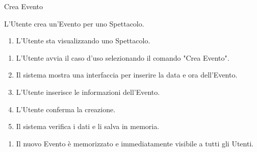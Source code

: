 {\ucExtTable	%
{	%
	Crea Evento
	
}{	%
	
}{	%
	L'Utente crea un'Evento per uno Spettacolo.
	
}{	%
	\attori
	
}{	%
	\begin{enumerate}
        \item L'Utente sta visualizzando uno Spettacolo.
    \end{enumerate}
	
}{	%
	\begin{enumerate}
        \item L'Utente avvia il caso d'uso selezionando il comando "Crea Evento".
        \item Il sistema mostra una interfaccia per inserire la data e ora dell'Evento.
        \item L'Utente inserisce le informazioni dell'Evento.
        \item L'Utente conferma la creazione.
        \item Il sistema verifica i dati e li salva in memoria.
    \end{enumerate}
	
}{	%
	\begin{enumerate}
        \item Il nuovo Evento è memorizzato e immediatamente visibile a tutti gli Utenti.
    \end{enumerate}
	
} }

